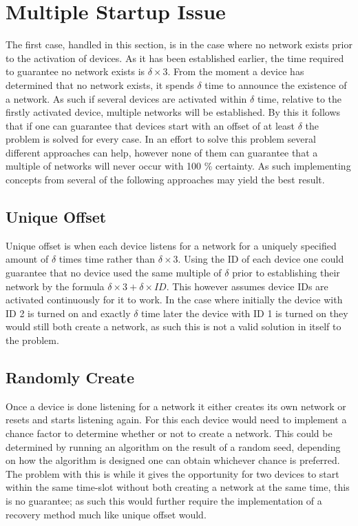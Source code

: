 \section{Multiple Startup Issue}\label{sec:MSI-CCRC}
The first case, handled in this section, is in the case where no network exists prior to the activation of devices.
As it has been established earlier, the time required to guarantee no network exists is $\delta \times 3$.
From the moment a device has determined that no network exists, it spends $\delta$ time to announce the existence of a network.
As such if several devices are activated within $\delta$ time, relative to the firstly activated device, multiple networks will be established.
By this it follows that if one can guarantee that devices start with an offset of at least $\delta$ the problem is solved for every case.
In an effort to solve this problem several different approaches can help, however none of them can guarantee that a multiple of networks will never occur with 100 \% certainty. 
As such implementing concepts from several of the following approaches may yield the best result.

\subsection{Unique Offset}
Unique offset is when each device listens for a network for a uniquely specified amount of $\delta$ times time rather than $\delta \times 3$.
Using the ID of each device one could guarantee that no device used the same multiple of $\delta$ prior to establishing their network by the formula $\delta \times 3 + \delta \times ID$.
This however assumes device IDs are activated continuously for it to work.
In the case where initially the device with ID 2 is turned on and exactly $\delta$ time later the device with ID 1 is turned on they would still both create a network, as such this is not a valid solution in itself to the problem.

\subsection{Randomly Create}\label{RCreate}
Once a device is done listening for a network it either creates its own network or resets and starts listening again.
For this each device would need to implement a chance factor to determine whether or not to create a network.
This could be determined by running an algorithm on the result of a random seed, depending on how the algorithm is designed one can obtain whichever chance is preferred.
The problem with this is while it gives the opportunity for two devices to start within the same time-slot without both creating a network at the same time, this is no guarantee; as such this would further require the implementation of a recovery method much like unique offset would.

